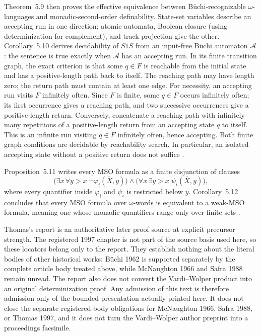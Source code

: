Theorem~5.9 then proves the effective equivalence between B\"uchi-recognizable
\(\omega\)-languages and monadic-second-order definability.  State-set
variables describe an accepting run in one direction; atomic automata,
Boolean closure (using determinization for complement), and track projection
give the other.  Corollary~5.10 derives decidability of \(S1S\) from an
input-free B\"uchi automaton \(\mathcal A\): the sentence is true exactly
when \(\mathcal A\) has an accepting run.  In its finite transition graph,
the exact criterion is that some \(q\in F\) is reachable from the initial
state and has a positive-length path back to itself.  The reaching path
may have length zero; the return path must contain at least one edge.
For necessity, an accepting run visits \(F\) infinitely often.  Since
\(F\) is finite, some \(q\in F\) occurs infinitely often; its first
occurrence gives a reaching path, and two successive occurrences give
a positive-length return.  Conversely, concatenate a reaching path with
infinitely many repetitions of a positive-length return from an accepting
state \(q\) to itself.  This is an infinite run visiting \(q\in F\)
infinitely often, hence accepting.  Both finite graph conditions are
decidable by reachability search.  In particular, an isolated accepting
state without a positive return does not suffice
\cite[Cor.~5.10, p.~38]{Thomas1996Report}.

Proposition~5.11 writes every MSO formula
as a finite disjunction of clauses
\[
 \bigl(\exists x\,\forall y>x\;\neg\varphi_i(\bar X,y)\bigr)
 \land
 \bigl(\forall x\,\exists y>x\;\psi_i(\bar X,y)\bigr),
\]
where every quantifier inside \(\varphi_i\) and \(\psi_i\) is restricted below
\(y\).  Corollary~5.12 concludes that every MSO formula over \(\omega\)-words
is equivalent to a weak-MSO formula, meaning one whose monadic quantifiers
range only over finite sets
\cite[\S5.3]{Thomas1996Report}.

Thomas's report is an authoritative later proof source at explicit precursor
strength.  The registered 1997 chapter is not part of the source basis used
here, so these locators belong only to the report.  They establish nothing
about the literal bodies of other historical works: B\"uchi 1962 is supported
separately by the complete article body treated above, while McNaughton 1966
and Safra 1988 remain unread.  The report also does not convert the
Vardi--Wolper product into an original determinization proof.
Any admission of this text is therefore admission only of the bounded
presentation actually printed here.  It does not close the separate
registered-body obligations for McNaughton 1966, Safra 1988, or Thomas 1997,
and it does not turn the Vardi--Wolper author preprint into a proceedings
facsimile.
